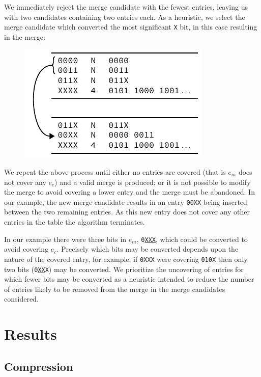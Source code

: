 \documentclass[conference]{IEEEtran}
\newcommand{\mytt}[1]{\texttt{\footnotesize#1}}
\begin{document}
  We immediately reject the merge candidate with the fewest entries, leaving us with two candidates containing two entries each.
  As a heuristic, we select the merge candidate which converted the most significant \mytt{X} bit, in this case resulting in the merge:\par\nopagebreak
  \begin{figure}[H]
    \centering
    \includegraphics{figures/downcheck_resolve_example_2}
  \end{figure}
  
  We repeat the above process until either no entries are covered (that is $e_m$ does not cover any $e_c$) and a valid merge is produced; or it is not possible to modify the merge to avoid covering a lower entry and the merge must be abandoned.
  In our example, the new merge candidate results in an entry \mytt{00XX} being inserted between the two remaining entries.
  As this new entry does not cover any other entries in the table the algorithm terminates.
  
  In our example there were three bits in $e_m$, \mytt{0\underline{XXX}}, which could be converted to avoid covering $e_c$.
  Precisely which bits may be converted depends upon the nature of the covered entry, for example, if \mytt{0XXX} were covering \mytt{010X} then only two bits (\mytt{0\underline{XX}X}) may be converted.
  We prioritize the uncovering of entries for which fewer bits may be converted as a heuristic intended to reduce the number of entries likely to be removed from the merge in the merge candidates considered.

  \section{Results}

  \subsection{Compression}
\end{document}
